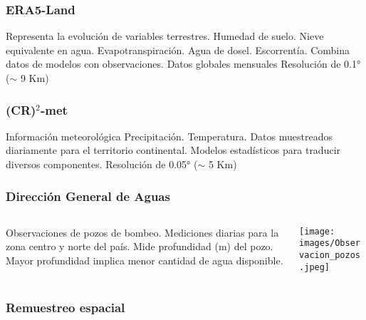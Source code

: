 \documentclass{beamer}
\begin{document}
  \begin{frame}
    \frametitle{ERA5-Land}
    \begin{outline}
      \1 Representa la evolución de variables terrestres.
        \2 Humedad de suelo.
        \2 Nieve equivalente en agua.
        \2 Evapotranspiración.
        \2 Agua de dosel.
        \2 Escorrentía.
      \1 Combina datos de modelos con observaciones.
      \1 Datos globales mensuales
      \1 Resolución de 0.1° ($\sim$ 9 Km)
    \end{outline}

  \end{frame}

  \begin{frame}
    \frametitle{(CR)$^2$-met}

    \begin{outline}
      \1 Información meteorológica
        \2 Precipitación.
        \2 Temperatura.
      \1 Datos muestreados diariamente para el territorio continental.
      \1 Modelos estadísticos para traducir diversos componentes.  
      \1 Resolución de 0.05° ($\sim$ 5 Km)
    \end{outline}

  \end{frame}

  \begin{frame}
    \frametitle{Dirección General de Aguas}

    \begin{columns}
    
      \begin{column}{0.5\textwidth}
        \begin{outline}
          \1 Observaciones de pozos de bombeo.
          \1 Mediciones diarias para la zona centro y norte del país.
          \1 Mide profundidad (m) del pozo.
            \2 Mayor profundidad implica menor cantidad de agua disponible.
        \end{outline}
      \end{column}

      \begin{column}{0.5\textwidth}
        \centering
        \texttt{[image: images/Observacion\_pozos.jpeg]}
      \end{column}

    \end{columns}
  \end{frame}

  \begin{frame}
    \frametitle{Remuestreo espacial}
  \end{frame}
\end{document}
